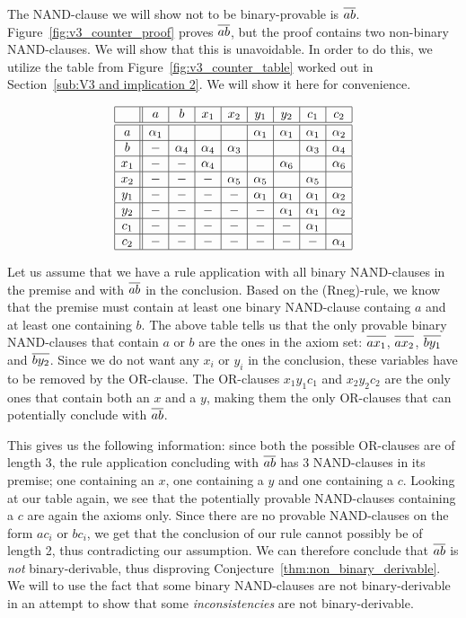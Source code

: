 The NAND-clause we will show not to be binary-provable is $\ol{ab}$.
Figure~\ref{fig:v3_counter_proof} proves $\ol{ab}$, but the proof contains two non-binary NAND-clauses.
We will show that this is unavoidable.
In order to do this, we utilize the table from Figure~\ref{fig:v3_counter_table} worked out in Section~\ref{sub:V3 and implication 2}.
We will show it here for convenience.\par
\begin{figure}[!h]
  \centering
  \[\begin{array}{|c||c|c|c|c|c|c|c|c|}
    \hline
    & a & b & x_1 & x_2 & y_1 & y_2 & c_1 & c_2 \\ \hline\hline
    a & \alpha_1 & & & & \alpha_1 & \alpha_1 & \alpha_1 & \alpha_2 \\ \hline
    b &-& \alpha_4 & \alpha_4 & \alpha_3 & & & \alpha_3 & \alpha_4 \\ \hline
    x_1 &-&-& \alpha_4 & & & \alpha_6 & & \alpha_6 \\ \hline
    x_2 &-&-&-& \alpha_5 & \alpha_5 & & \alpha_5 & \\ \hline
    y_1 &-&-&-&-& \alpha_1 & \alpha_1 & \alpha_1 & \alpha_2 \\ \hline
    y_2 &-&-&-&-&-& \alpha_1 & \alpha_1 & \alpha_2 \\ \hline
    c_1 &-&-&-&-&-&-& \alpha_1 & \\ \hline
    c_2 &-&-&-&-&-&-&-& \alpha_4 \\ \hline
  \end{array}\]
  \caption{}
  \label{fig:open_door_table}
\end{figure}

Let us assume that we have a rule application with all binary NAND-clauses in the premise and with $\ol{ab}$ in the conclusion.
Based on the (Rneg)-rule, we know that the premise must contain at least one binary NAND-clause containg $a$ and at least one containing $b$.
The above table tells us that the only provable binary NAND-clauses that contain $a$ or $b$ are the ones in the axiom set:
$\ol{ax_1}$, $\ol{ax_2}$, $\ol{by_1}$ and $\ol{by_2}$.
Since we do not want any $x_i$ or $y_i$ in the conclusion, these variables have to be removed by the OR-clause.
The OR-clauses $x_1y_1c_1$ and $x_2y_2c_2$ are the only ones that contain both an $x$ and a $y$, making them the only OR-clauses that can potentially conclude with $\ol{ab}$.

This gives us the following information: since both the possible OR-clauses are of length 3, the rule application concluding with $\ol{ab}$ has 3 NAND-clauses in its premise; one containing an $x$, one containing a $y$ and one containing a $c$.
Looking at our table again, we see that the potentially provable NAND-clauses containing a $c$ are again the axioms only.
Since there are no provable NAND-clauses on the form $ac_i$ or $bc_i$, we get that the conclusion of our rule cannot possibly be of length 2, thus contradicting our assumption.
We can therefore conclude that $\ol{ab}$ is \textit{not} binary-derivable, thus disproving Conjecture~\ref{thm:non_binary_derivable}.
We will to use the fact that some binary NAND-clauses are not binary-derivable in an attempt to show that some \textit{inconsistencies} are not binary-derivable.
